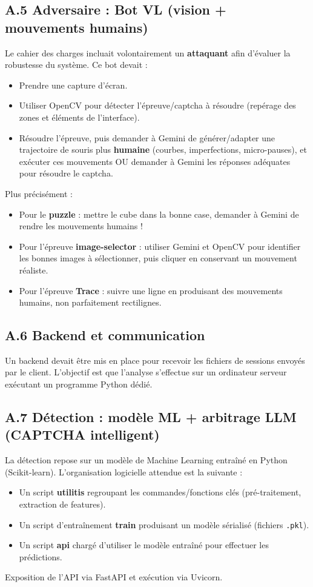 \documentclass[a4paper, 12pt, twoside]{article}
\begin{document}
\subsection*{A.5 Adversaire : Bot VL (vision + mouvements humains)}
Le cahier des charges incluait volontairement un \textbf{attaquant} afin d'évaluer la robustesse du système. Ce bot devait :
\begin{itemize}
    \item Prendre une capture d'écran.
    \item Utiliser OpenCV pour détecter l'épreuve/captcha à résoudre (repérage des zones et éléments de l'interface).
    \item Résoudre l'épreuve, puis demander à Gemini de générer/adapter une trajectoire de souris plus \textbf{humaine} (courbes, imperfections, micro-pauses), et exécuter ces mouvements OU demander à Gemini les réponses adéquates pour résoudre le captcha.
\end{itemize}

Plus précisément :
\begin{itemize}
    \item Pour le \textbf{puzzle} : mettre le cube dans la bonne case, demander à Gemini de rendre les mouvements humains !
    \item Pour l'épreuve \textbf{image-selector} : utiliser Gemini et OpenCV pour identifier les bonnes images à sélectionner, puis cliquer en conservant un mouvement réaliste.
    \item Pour l'épreuve \textbf{Trace} : suivre une ligne en produisant des mouvements humains, non parfaitement rectilignes.
\end{itemize}

\subsection*{A.6 Backend et communication}
Un backend devait être mis en place pour recevoir les fichiers de sessions envoyés par le client.
L'objectif est que l'analyse s'effectue sur un ordinateur serveur exécutant un programme Python dédié.

\subsection*{A.7 Détection : modèle ML + arbitrage LLM (CAPTCHA intelligent)}
La détection repose sur un modèle de Machine Learning entraîné en Python (Scikit-learn). L'organisation logicielle attendue est la suivante :
\begin{itemize}
    \item Un script \textbf{utilitis} regroupant les commandes/fonctions clés (pré-traitement, extraction de features).
    \item Un script d'entraînement \textbf{train} produisant un modèle sérialisé (fichiers \texttt{.pkl}).
    \item Un script \textbf{api} chargé d'utiliser le modèle entraîné pour effectuer les prédictions.
\end{itemize}
Exposition de l'API via FastAPI et exécution via Uvicorn.
\end{document}
